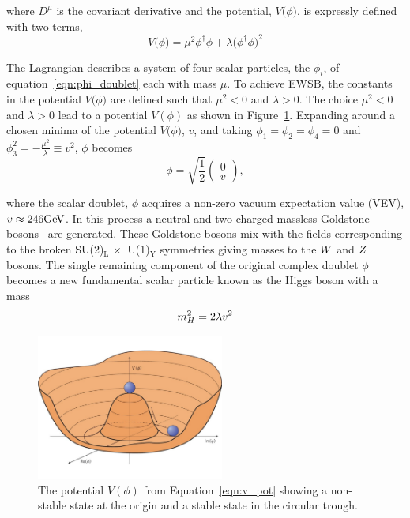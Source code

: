 where $D^{\mu}$ is the covariant derivative and the potential, $V\big(\phi\big)$, 
is expressly defined with two terms, 
\begin{equation}
V\big(\phi\big) = \mu^{2}\phi^{\dagger}\phi + \lambda\big(\phi^{\dagger}\phi\big)^{2}
\label{eqn:v_pot}
\end{equation}

The Lagrangian describes a system of four scalar particles, the $\phi_{i}$,
of equation~\ref{eqn:phi_doublet} each with mass $\mu$. 
To achieve EWSB, the constants in the potential $V\big(\phi\big)$ are defined such that $\mu^{2} < 0$
and $\lambda > 0$. The choice $\mu^{2} < 0$ and $\lambda > 0$ lead to a potential $V\left(\phi\right)$
as shown in Figure~\ref{fig:higgs_potential}. Expanding around a chosen minima of the potential
$V\big(\phi\big)$, $v$, and taking $\phi_{1} = \phi_{2} = \phi_{4} = 0$ and
$\phi_{3}^{2} = -\frac{\mu^{2}}{\lambda} \equiv v^{2}$, $\phi$ becomes
\begin{equation}
\phi = \sqrt{\frac{1}{2}} \begin{pmatrix} 0 \\ v \end{pmatrix},
\label{eqn:phi_doublet_exp}
\end{equation}

where the scalar doublet, $\phi$ acquires a non-zero vacuum expectation value (VEV), $v \approx 246\mathrm{GeV}$.
In this process a neutral and two charged massless Goldstone bosons~\cite{PhysRev.127.965} are generated. These Goldstone
bosons mix with the fields corresponding to the broken SU(2)$_{\text{L}} \,\times\,$ U(1)$_{\text{Y}}$
symmetries giving masses to the $W$ and $Z$ bosons. The single remaining component of the
original complex doublet $\phi$ becomes a new fundamental scalar particle 
known as the Higgs boson with a mass
\begin{equation}
m_{H}^{2} = 2\lambda v^2
\end{equation}


\begin{figure}[htbp]
\centering
     \includegraphics[width=0.55\textwidth]{phenomenology_of_processes/plots/higgs_potential.pdf}
     \caption{
The potential $V\left(\phi\right)$ from Equation~\ref{eqn:v_pot} showing a non-stable state
at the origin and a stable state in the circular trough.
     }
     \label{fig:higgs_potential}
\end{figure}



